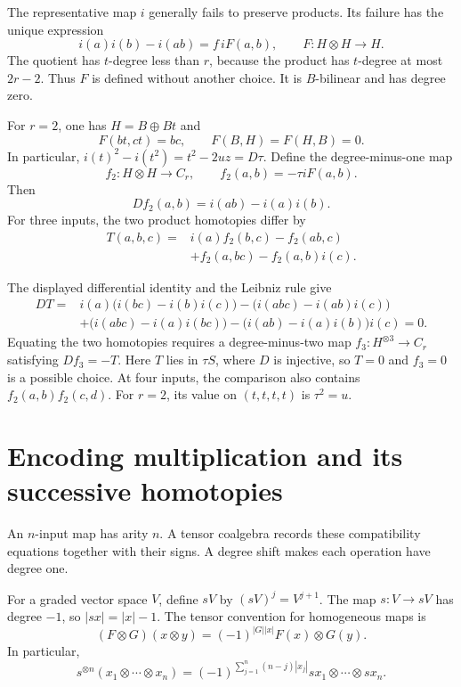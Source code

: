 The representative map $i$ generally fails to preserve products.
Its failure has the unique expression
\begin{equation}\label{eq:ha-F-definition}
 i(a)i(b)-i(ab)=f\,iF(a,b),
 \qquad F:H\otimes H\longrightarrow H.
\end{equation}
The quotient has $t$-degree less than $r$, because the product has
$t$-degree at most $2r-2$. Thus $F$ is defined without another choice.
It is $B$-bilinear and has degree zero.

For $r=2$, one has $H=B\oplus Bt$ and
\[
 F(bt,ct)=bc,\qquad F(B,H)=F(H,B)=0.
\]
In particular, $i(t)^2-i(t^2)=t^2-2uz=D\tau$.
Define the degree-minus-one map
\[
 f_2:H\otimes H\longrightarrow C_r,\qquad
 f_2(a,b)=-\tau iF(a,b).
\]
Then
\[
 Df_2(a,b)=i(ab)-i(a)i(b).
\]
For three inputs, the two product homotopies differ by
\[
 \begin{split}
 T(a,b,c)={}&i(a)f_2(b,c)-f_2(ab,c)\\
 &+f_2(a,bc)-f_2(a,b)i(c).
 \end{split}
\]

The displayed differential identity and the Leibniz rule give
\[
 \begin{split}
 DT={}&i(a)\bigl(i(bc)-i(b)i(c)\bigr)
       -\bigl(i(abc)-i(ab)i(c)\bigr)\\
 &+\bigl(i(abc)-i(a)i(bc)\bigr)
       -\bigl(i(ab)-i(a)i(b)\bigr)i(c)=0.
 \end{split}
\]
Equating the two homotopies requires a degree-minus-two map
$f_3:H^{\otimes3}\to C_r$ satisfying $Df_3=-T$.
Here $T$ lies in $\tau S$, where $D$ is injective, so $T=0$
and $f_3=0$ is a possible choice.
At four inputs, the comparison also contains
$f_2(a,b)f_2(c,d)$.
For $r=2$, its value on $(t,t,t,t)$ is $\tau^2=u$.

\section{Encoding multiplication and its successive homotopies}
\label{sec:ha-coalgebra}

An $n$-input map has arity $n$.
A tensor coalgebra records these compatibility equations together
with their signs. A degree shift makes each operation have degree one.

For a graded vector space $V$, define $sV$ by $(sV)^j=V^{j+1}$.
The map $s:V\to sV$ has degree $-1$, so $|sx|=|x|-1$.
The tensor convention for homogeneous maps is
\[
 (F\otimes G)(x\otimes y)=(-1)^{|G||x|}F(x)\otimes G(y).
\]
In particular,
\[
 s^{\otimes n}(x_1\otimes\cdots\otimes x_n)
 =(-1)^{\sum_{j=1}^n(n-j)|x_j|}
 sx_1\otimes\cdots\otimes sx_n.
\]


